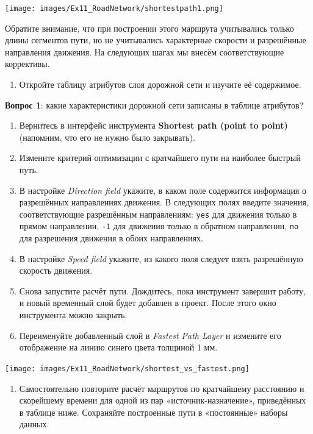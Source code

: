 \documentclass[
  12pt,
]{book}
\providecommand{\tightlist}{%
  \setlength{\itemsep}{0pt}\setlength{\parskip}{0pt}}
\begin{document}
\texttt{[image: images/Ex11\_RoadNetwork/shortestpath1.png]}

Обратите внимание, что при построении этого маршрута учитывались только длины сегментов пути, но не учитывались характерные скорости и разрешённые направления движения. На следующих шагах мы внесём соответствующие коррективы.

\begin{enumerate}
\def\labelenumi{\arabic{enumi}.}
\setcounter{enumi}{10}
\tightlist
\item
  Откройте таблицу атрибутов слоя дорожной сети и изучите её содержимое.
\end{enumerate}

\textbf{Вопрос 1}: какие характеристики дорожной сети записаны в таблице атрибутов?

\begin{enumerate}
\def\labelenumi{\arabic{enumi}.}
\setcounter{enumi}{11}
\item
  Вернитесь в интерфейс инструмента \textbf{Shortest path (point to point)} (напомним, что его не нужно было закрывать).
\item
  Измените критерий оптимизации с кратчайшего пути на наиболее быстрый путь.
\item
  В настройке \emph{Direction field} укажите, в каком поле содержится информация о разрешённых направлениях движения. В следующих полях введите значения, соответствующие разрешённым направлениям: \texttt{yes} для движения только в прямом направлении, \texttt{-1} для движения только в обратном направлении, \texttt{no} для разрешения движения в обоих направлениях.
\item
  В настройке \emph{Speed field} укажите, из какого поля следует взять разрешённую скорость движения.
\item
  Снова запустите расчёт пути. Дождитесь, пока инструмент завершит работу, и новый временный слой будет добавлен в проект. После этого окно инструмента можно закрыть.
\item
  Переименуйте добавленный слой в \emph{Fastest Path Layer} и измените его отображение на линию синего цвета толщиной 1 мм.
\end{enumerate}

\texttt{[image: images/Ex11\_RoadNetwork/shortest\_vs\_fastest.png]}

\begin{enumerate}
\def\labelenumi{\arabic{enumi}.}
\setcounter{enumi}{17}
\tightlist
\item
  Самостоятельно повторите расчёт маршрутов по кратчайшему расстоянию и скорейшему времени для одной из пар «источник-назначение», приведённых в таблице ниже. Сохраняйте построенные пути в «постоянные» наборы данных.
\end{enumerate}
\end{document}
